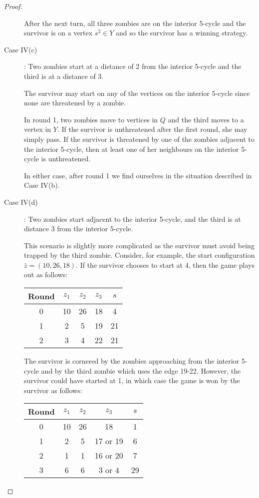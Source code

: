\begin{proof}
\begin{description}
After the next turn, all three zombies are on the interior 5-cycle and the survivor is on a vertex $s^2 \in Y$ and so the survivor has a winning strategy.

\item[Case IV(c)]: Two zombies start at a distance of 2 from the interior 5-cycle and the third is at a distance of 3.

The survivor may start on any of the vertices on the interior 5-cycle since none are threatened by a zombie.

In round 1, two zombies move to vertices in $Q$ and the third moves to a vertex in $Y$. If the survivor is unthreatened after the first round, she may simply pass.
If the survivor is threatened by one of the zombies adjacent to the interior 5-cycle, then at least one of her neighbours on the interior 5-cycle is unthreatened.

In either case, after round 1 we find ourselves in the situation described in Case IV(b).

\item[Case IV(d)]: Two zombies start adjacent to the interior 5-cycle, and the third is at distance 3 from the interior 5-cycle.

This scenario is slightly more complicated as the survivor must avoid being trapped by the third zombie. Consider, for example, the start configuration
$\bar{z} = (10, 26, 18)$. If the survivor chooses to start at 4, then the game plays out as follows:

\begin{tabular}{c | c | c | c | c }
Round & $z_1$ & $z_2$ & $z_3$ & $s$ \\
\hline
0 & 10 & 26 & 18 & 4 \\
1 & 2 & 5 & 19 & 21 \\
2 & 3 & 4 & 22 & 21
\end{tabular}

The survivor is cornered by the zombies approaching from the interior 5-cycle and by the third zombie which uses the edge 19-22.
However, the survivor could have started at 1, in which case the game is won by the survivor as follows:

\begin{tabular}{c | c | c | c | c }
Round & $z_1$ & $z_2$ & $z_3$ & $s$ \\
\hline
0 & 10 & 26 & 18 & 1 \\
1 & 2 & 5 & 17 or 19 & 6 \\
2 & 1 & 1 & 16 or 20 & 7 \\
3 & 6 & 6 & 3 or 4 & 29
\end{tabular}


\end{description}
\end{proof}
